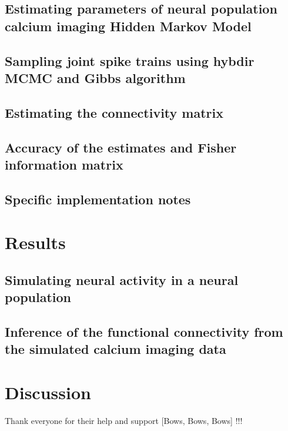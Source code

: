 \documentclass[amsmath, amssymb]{revtex4}
\begin{document}
\subsection{Estimating parameters of neural population calcium imaging Hidden Markov Model}
\label{sec:methods:estimating_parameters}


\clearpage
\subsection{Sampling joint spike trains using hybdir MCMC and Gibbs algorithm}
\label{sec:methods:sampling HMM}


\subsection{Estimating the connectivity matrix} %
\label{sec:methods:parameters HMM}



\subsection{Accuracy of the estimates and Fisher information matrix}
\label{sec:methods:accuracy_Fisher}


\subsection{Specific implementation notes}
\label{sec:methods:specific_implementation}


\section{Results}
\label{results}

\subsection{Simulating neural activity in a neural population}
\label{sec:results:simulations}


\subsection{Inference of the functional connectivity from the simulated calcium imaging data}
\label{sec:results:inference}


\section{Discussion}
\label{discussion}


\begin{acknowledgments}
Thank everyone for their help and support [Bows, Bows, Bows] !!!
\end{acknowledgments}



\end{document}
